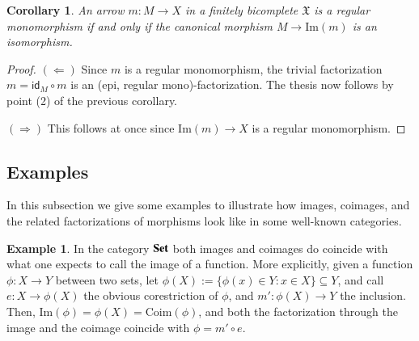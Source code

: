 \documentclass[12pt]{article}
\newtheorem{corollary}[lemma]{Corollary}
\theoremstyle{definition}
\newtheorem{example}[lemma]{Example}
\def\X{\mathfrak X}
\def\Coim{\mathrm{Coim}}
\def\Im{\mathrm{Im}}
\newcommand{\Set}{\textbf{\textup{Set}}}
\numberwithin{equation}{section}
\newcommand{\im}[1]{\mathrm{Im}(#1)}
\newcommand{\id}[1]{\mathsf{id}_{#1}}
\begin{document}
\begin{corollary}\label{reg2}
An arrow $m\colon M\rightarrow X$ in a finitely bicomplete $\X$ is a regular monomorphism if and only if the canonical morphism $M\to \Im(m)$ is an isomorphism.
\end{corollary}
\begin{proof}
	$(\Leftarrow)$ Since $m$ is a regular monomorphism, the trivial factorization $m=\id M\circ m$ is an (epi, regular mono)-factorization. The thesis now follows by point (2) of the previous corollary. 
	
	\smallskip\noindent
	$(\Rightarrow)$  This follows at once since $\Im(m)\to X$ is a regular monomorphism. 
\end{proof}



\subsection{Examples}

In this subsection we give some examples to illustrate how images, coimages, and the related factorizations of morphisms look like in some well-known categories. 


\begin{example}
In the category $\Set$ both images and coimages do coincide with what one expects to call the image of a function. More explicitly, given a function $\phi\colon X\to Y$ between two sets, let $\phi(X):=\{\phi(x)\in Y:x\in X\}\subseteq Y$, and call $e\colon X\to \phi(X)$ the obvious corestriction of $\phi$, and $m'\colon \phi(X)\to Y$ the inclusion. Then, $\Im(\phi)=\phi(X)=\Coim(\phi)$, and both the factorization through the image and the coimage coincide with $\phi=m'\circ e$.
\end{example}
\end{document}
